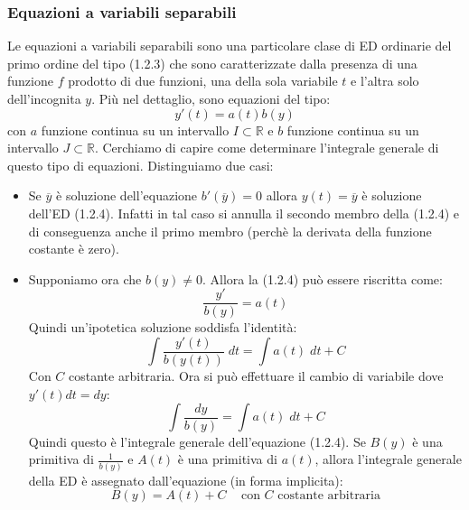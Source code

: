 \documentclass[a4paper]{article}
\numberwithin{equation}{subsection}
\begin{document}

\subsubsection{Equazioni a variabili separabili}

Le equazioni a variabili separabili sono una particolare clase di ED ordinarie del primo ordine
del tipo (1.2.3) che sono caratterizzate dalla presenza di una funzione $f$ prodotto di due funzioni,
una della sola variabile $t$ e l'altra solo dell'incognita $y$. Più nel dettaglio, sono equazioni del
tipo:
\begin{equation}
    y'(t) = a(t)b(y)
\end{equation}
con $a$ funzione continua su un intervallo $I \subset \mathbb{R}$ e $b$ funzione continua su un intervallo $J \subset \mathbb{R}$.
Cerchiamo di capire come determinare l'integrale generale di questo tipo di equazioni.
Distinguiamo due casi:
\begin{itemize}
    \item Se $\overline{y}$ è soluzione dell'equazione $b'(\overline{y}) = 0$ allora $y(t) = \overline{y}$ è soluzione dell'ED (1.2.4). Infatti in tal caso si annulla il secondo membro della (1.2.4) e di conseguenza anche il primo
    membro (perchè la derivata della funzione costante è zero). 
    \item Supponiamo ora che $b(y) \neq 0$. Allora la (1.2.4) può essere riscritta come:
    \begin{equation*}
        \frac{y'}{b(y)} = a(t)
    \end{equation*}
    Quindi un'ipotetica soluzione soddisfa l'identità:
    \begin{equation*}
        \int \frac{y'(t)}{b(y(t))} \; dt = \int a(t) \; dt + C
    \end{equation*}
    Con $C$ costante arbitraria.
    Ora si può effettuare il cambio di variabile dove $y'(t)dt = dy$:
    \begin{equation*}
        \int \frac{dy}{b(y)} = \int a(t) \; dt + C
    \end{equation*}
    Quindi questo è l'integrale generale dell'equazione (1.2.4). Se $B(y)$ è una primitiva di $\frac{1}{b(y)}$ e $A(t)$ è una primitiva di $a(t)$, allora l'integrale generale della ED è assegnato dall'equazione (in forma implicita):
    \begin{equation*}
        B(y) = A(t) + C \; \; \; \text{ con $C$ costante arbitraria}
    \end{equation*}
\end{itemize}
\end{document}
